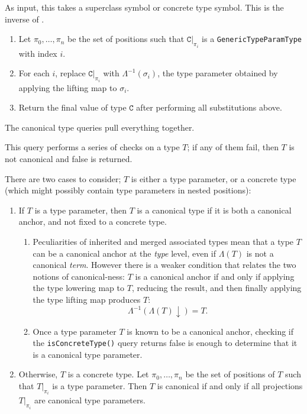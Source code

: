 \documentclass[../generics]{subfiles}
\begin{document}
\begin{algorithm}\label{alg:symbol to type}
As input, this takes a
superclass symbol or
concrete type symbol. This is the inverse of .

\begin{enumerate}
\item Let $\pi_0,\ldots,\pi_n$ be the set of positions such that $\texttt{C}|_{\pi_i}$ is a
\texttt{GenericTypeParamType} with index $i$.
\item For each $i$, replace $\texttt{C}|_{\pi_i}$ with $\Lambda^{-1}(\sigma_i)$, the type
parameter obtained by applying the lifting map to $\sigma_i$.
\item Return the final value of type $\texttt{C}$ after performing all substitutions above.
\end{enumerate}
\end{algorithm}

The canonical type queries pull everything together.

\begin{algorithm}\label{alg:is reduced type}
This query performs a series of checks on a type $T$; if any of them fail, then $T$ is not canonical and false is returned.

There are two cases to consider; $T$ is either a type parameter, or a concrete type (which might possibly contain type parameters in nested positions):
\begin{enumerate}
\item If $T$ is a type parameter, then $T$ is a canonical type if it is both a canonical anchor, and not fixed to a concrete type.
\begin{enumerate}
\item
Peculiarities of inherited and merged associated types mean that a type $T$ can be a canonical anchor at the \emph{type} level, even if $\Lambda(T)$ is not a canonical \emph{term}. However there is a weaker condition that relates the two notions of canonical-ness: $T$ is a canonical anchor if and only if applying the type lowering map to $T$, reducing the result, and then finally applying the type lifting map produces $T$:
\[\Lambda^{-1}(\Lambda(T){\downarrow})=T.\]
\item
Once a type parameter $T$ is known to be a canonical anchor, checking if the \texttt{isConcreteType()} query returns false is enough to determine that it is a canonical type parameter.
\end{enumerate}
\item Otherwise, $T$ is a concrete type. Let $\pi_0,\ldots,\pi_n$ be the set of positions of $T$ such
that $T|_{\pi_i}$ is a type parameter. Then $T$ is canonical if and only if all
projections $T|_{\pi_i}$ are canonical type parameters.
\end{enumerate}
\end{algorithm}
\end{document}
